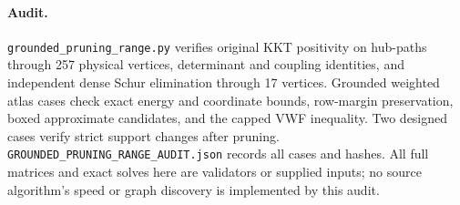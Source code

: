 \paragraph{Audit.}
\texttt{grounded\_pruning\_range.py} verifies original KKT positivity on
hub-paths through 257 physical vertices, determinant and coupling identities,
and independent dense Schur elimination through 17 vertices. Grounded
weighted atlas cases check exact energy and coordinate bounds, row-margin
preservation, boxed approximate candidates, and the capped VWF inequality.
Two designed cases verify strict support changes after pruning.
\texttt{GROUNDED\_PRUNING\_RANGE\_AUDIT.json} records all cases and hashes.
All full matrices and exact solves here are validators or supplied inputs;
no source algorithm's speed or graph discovery is implemented by this audit.
